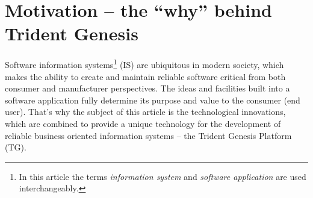 \section{Motivation -- the ``why'' behind Trident Genesis}\label{sec:01}
  Software information systems\footnote{
    In this article the terms \emph{information system} and \emph{software application} are used interchangeably.
  } 
  (IS) are ubiquitous in modern society, which makes the ability to create and maintain reliable software critical from both consumer and manufacturer perspectives.
  The ideas and facilities built into a software application fully determine its purpose and value to the consumer (end user).
  That's why the subject of this article is the technological innovations, which are combined to provide a unique technology for the development of reliable business oriented information systems -- the Trident Genesis Platform (TG).

